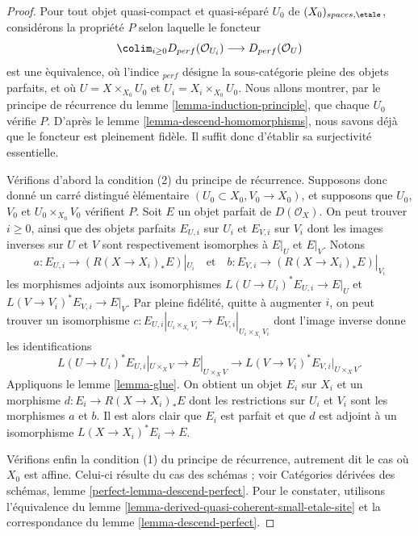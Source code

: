 \begin{proof}
Pour tout objet quasi-compact et quasi-s\'epar\'e $U_0$ de
$(X_0)_{spaces,\etale}$, consid\'erons la propri\'et\'e $P$ selon laquelle le
foncteur
$$
\colim_{i \geq 0} D_{perf}(\mathcal{O}_{U_i})
\longrightarrow
D_{perf}(\mathcal{O}_U)
$$
est une \`equivalence, o\`u l'indice ${}_{perf}$ d\'esigne la sous-cat\'egorie
pleine des objets parfaits, et o\`u $U=X\times_{X_0}U_0$ et
$U_i=X_i\times_{X_0}U_0$. Nous allons montrer, par le principe de r\'ecurrence
du lemme \ref{lemma-induction-principle}, que chaque $U_0$ v\'erifie $P$.
D'apr\`es le lemme \ref{lemma-descend-homomorphisms}, nous savons d\'ej\`a que
le foncteur est pleinement fid\`ele. Il suffit donc d'\'etablir sa surjectivit\'e
essentielle.

\medskip\noindent
V\'erifions d'abord la condition (2) du principe de r\'ecurrence. Supposons donc
donn\'e un carr\'e distingu\'e \`el\'ementaire
$(U_0\subset X_0,V_0\to X_0)$, et supposons que $U_0$, $V_0$ et
$U_0\times_{X_0}V_0$ v\'erifient $P$. Soit $E$ un objet parfait de
$D(\mathcal{O}_X)$. On peut trouver $i\geq0$, ainsi que des objets parfaits
$E_{U,i}$ sur $U_i$ et $E_{V,i}$ sur $V_i$ dont les images inverses sur $U$
et $V$ sont respectivement isomorphes \`a $E|_U$ et $E|_V$. Notons
$$
a : E_{U, i} \to (R(X \to X_i)_*E)|_{U_i}
\quad\text{et}\quad
b : E_{V, i} \to (R(X \to X_i)_*E)|_{V_i}
$$
les morphismes adjoints aux isomorphismes
$L(U\to U_i)^*E_{U,i}\to E|_U$ et
$L(V\to V_i)^*E_{V,i}\to E|_V$. Par pleine fid\'elit\'e, quitte \`a augmenter
$i$, on peut trouver un isomorphisme
$c:E_{U,i}|_{U_i\times_{X_i}V_i}\to
E_{V,i}|_{U_i\times_{X_i}V_i}$ dont l'image inverse donne les identifications
$$
L(U \to U_i)^*E_{U, i}|_{U \times_X V} \to E|_{U \times_X V} \to
L(V \to V_i)^*E_{V, i}|_{U \times_X V}.
$$
Appliquons le lemme \ref{lemma-glue}. On obtient un objet $E_i$ sur $X_i$ et
un morphisme $d:E_i\to R(X\to X_i)_*E$ dont les restrictions sur $U_i$ et
$V_i$ sont les morphismes $a$ et $b$. Il est alors clair que $E_i$ est parfait
et que $d$ est adjoint \`a un isomorphisme $L(X\to X_i)^*E_i\to E$.

\medskip\noindent
V\'erifions enfin la condition (1) du principe de r\'ecurrence, autrement dit
le cas o\`u $X_0$ est affine. Celui-ci r\'esulte du cas des sch\'emas ; voir
Cat\'egories d\'eriv\'ees des sch\'emas, lemme
\ref{perfect-lemma-descend-perfect}. Pour le constater, utilisons
l'\'equivalence du lemme \ref{lemma-derived-quasi-coherent-small-etale-site}
et la correspondance du lemme \ref{lemma-descend-perfect}.
\end{proof}

